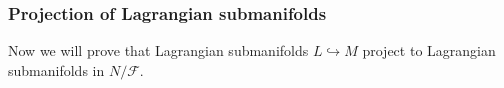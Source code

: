 \documentclass[12pt]{article}
\newtheorem{lemma}{Lemma}[section]
\renewcommand{\dim}{\operatorname{dim}}
\begin{document}
\subsubsection{Projection of Lagrangian submanifolds}
Now we will prove that Lagrangian submanifolds $L \hookrightarrow M$ project to Lagrangian submanifolds in $N/\mathcal{F}.$\\
\end{document}
